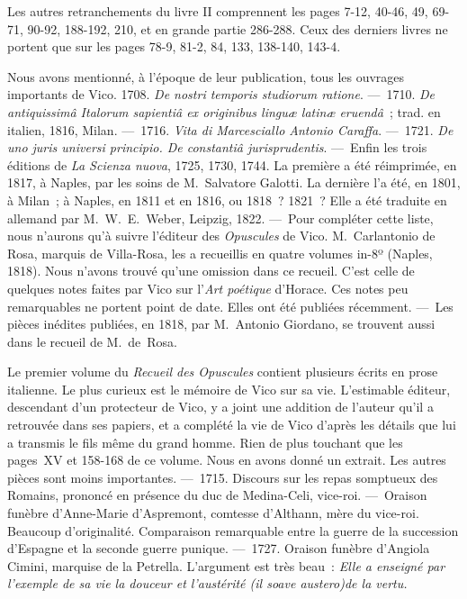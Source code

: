 \documentclass[french,twoside]{book} %
\begin{document}
Les autres retranchements du livre II comprennent les pages 7-12, 40-46, 49, 69-71, 90-92, 188-192, 210, et en grande partie 286-288. Ceux des derniers livres ne portent que sur les pages 78-9, 81-2, 84, 133, 138-140, 143-4.\par
\par
Nous avons mentionné, à l’époque de leur publication, tous les ouvrages importants de Vico. 1708. {\itshape De nostri temporis studiorum ratione}. — 1710. {\itshape De antiquissimâ Italorum sapientiâ ex originibus linguæ latinæ eruendâ} ; trad. en italien, 1816, Milan. — 1716. {\itshape Vita di Marcesciallo Antonio Caraffa}. — 1721. {\itshape De uno juris universi principio. De constantiâ jurisprudentis}. — Enfin les trois éditions de {\itshape La Scienza nuova}, 1725, 1730, 1744. La première a été réimprimée, en 1817, à Naples, par les soins de M. Salvatore Galotti. La dernière l’a été, en 1801, à Milan ; à Naples, en 1811 et en 1816, ou 1818 ? 1821 ? Elle a été traduite en allemand par M. W. E. Weber, Leipzig, 1822. — Pour compléter cette liste, nous n’aurons qu’à suivre l’éditeur des {\itshape Opuscules} de Vico. M. Carlantonio de Rosa, marquis de Villa-Rosa, les a recueillis en quatre volumes in-8º (Naples, 1818). Nous n’avons trouvé qu’une omission dans ce recueil. C’est celle de quelques notes faites par Vico sur l’{\itshape Art poétique} d’Horace. Ces notes peu remarquables ne portent point de date. Elles ont été publiées récemment. — Les pièces inédites publiées, en 1818, par M. Antonio Giordano, se trouvent aussi dans le recueil de M. de Rosa.\par
Le premier volume du {\itshape Recueil des Opuscules} contient plusieurs écrits en prose italienne. Le plus curieux est le mémoire de Vico sur sa vie. L’estimable éditeur, descendant d’un  protecteur de Vico, y a joint une addition de l’auteur qu’il a retrouvée dans ses papiers, et a complété la vie de Vico d’après les détails que lui a transmis le fils même du grand homme. Rien de plus touchant que les pages XV et 158-168 de ce volume. Nous en avons donné un extrait. Les autres pièces sont moins importantes. — 1715. Discours sur les repas somptueux des Romains, prononcé en présence du duc de Medina-Celi, vice-roi. — Oraison funèbre d’Anne-Marie d’Aspremont, comtesse d’Althann, mère du vice-roi. Beaucoup d’originalité. Comparaison remarquable entre la guerre de la succession d’Espagne et la seconde guerre punique. — 1727. Oraison funèbre d’Angiola Cimini, marquise de la Petrella. L’argument est très beau : \emph{{\itshape Elle a enseigné par l’exemple de sa vie la douceur et l’austérité} (il soave austero){\itshape  de la vertu.}}\par
\end{document}
